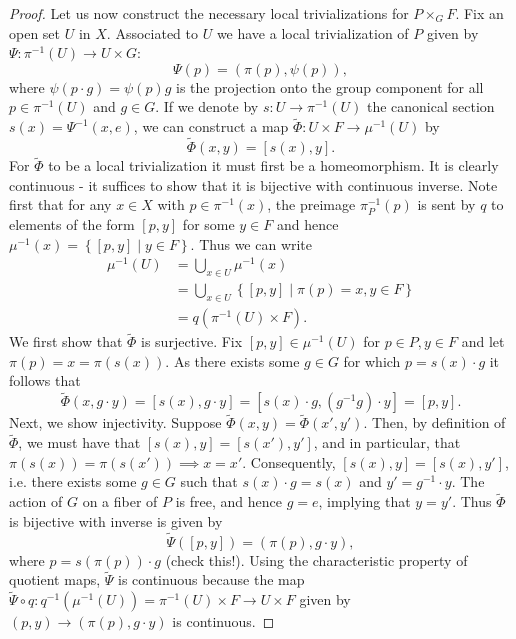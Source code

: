 \documentclass{book}
\theoremstyle{plain}
\theoremstyle{definition}
\theoremstyle{remark}
\begin{document}
\begin{proof}
    Let us now construct the necessary local trivializations for $P\times_G F$.
    Fix an open set $U$ in $X$. Associated to $U$ we have a local trivialization of $P$
    given by $\Psi:\pi^{-1}(U)\to U\times G$:
    \[\Psi(p)=(\pi(p),\psi(p)),\]
    where $\psi(p\cdot g)=\psi(p)g$ is the projection onto the group component for all $p\in\pi^{-1}(U)$ and $g\in G$.
    If we denote by $s:U\to\pi^{-1}(U)$ the canonical section $s(x)=\Psi^{-1}(x,e)$, we can construct a map
    $\tilde\Phi:U\times F\to\mu^{-1}(U)$ by
    \[\tilde\Phi(x,y)=[s(x),y].\]
    For $\tilde\Phi$ to be a local trivialization it must first be a homeomorphism. It is clearly continuous - it
    suffices to show that it is bijective with continuous inverse.
    Note first that for any $x\in X$ with $p\in\pi^{-1}(x)$,
    the preimage $\pi_P^{-1}(p)$ is sent by $q$ to elements of the form $[p,y]$ for some $y\in F$ and hence
    $\mu^{-1}(x)=\left\{ [p,y]\mid y\in F \right\}$. 
    Thus we can write
    \begin{align*}
        \mu^{-1}(U)&=\bigcup_{x\in U}\mu^{-1}(x)\\
        &=\bigcup_{x\in U}\left\{ [p,y]\mid \pi(p)=x,y\in F \right\}\\
        &=q(\pi^{-1}(U)\times F).
    \end{align*}
    We first show that $\tilde\Phi$ is surjective. Fix $[p,y]\in \mu^{-1}(U)$ for $p\in P, y\in F$
    and let $\pi(p)=x=\pi(s(x))$. As there exists some $g\in G$ for which $p=s(x)\cdot g$ it follows that
    \[\tilde\Phi(x,g\cdot y)=[s(x),g\cdot y]=[s(x)\cdot g,(g^{-1}g)\cdot y]=[p,y].\]
    Next, we show injectivity. Suppose $\tilde\Phi(x,y)=\tilde\Phi(x',y')$. Then, by definition of $\tilde\Phi$,
    we must have that $[s(x),y]=[s(x'),y']$, and in particular, that $\pi(s(x))=\pi(s(x'))\implies x=x'$.
    Consequently, $[s(x),y]=[s(x),y']$, i.e. there exists some $g\in G$ such that $s(x)\cdot g=s(x)$
    and $y'=g^{-1}\cdot y$. The action of $G$ on a fiber of $P$ is free, and hence $g=e$, implying that
    $y=y'$. Thus $\tilde\Phi$ is bijective with inverse is given by
    \[\tilde\Psi([p,y])=(\pi(p), g\cdot y),\]
    where $p=s(\pi(p))\cdot g$ (check this!). Using the characteristic property of quotient maps, $\tilde\Psi$
    is continuous because the map $\tilde\Psi\circ q:q^{-1}(\mu^{-1}(U))=\pi^{-1}(U)\times F\to U\times F$ given
    by $(p,y)\to(\pi(p),g\cdot y)$ is continuous.


\end{proof}
\end{document}
